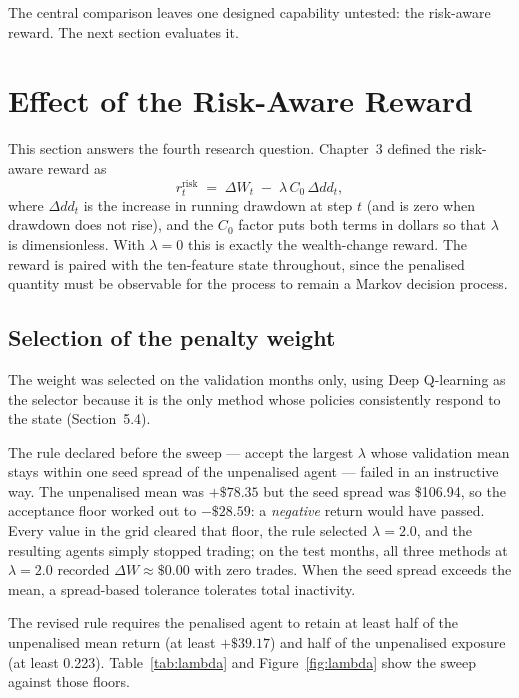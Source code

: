 The central comparison leaves one designed capability untested: the
risk-aware reward. The next section evaluates it.

\section{Effect of the Risk-Aware Reward}

This section answers the fourth research question. Chapter~3 defined the
risk-aware reward as
\[
r^{\mathrm{risk}}_t \;=\; \Delta W_t \;-\; \lambda\, C_0\, \Delta dd_t,
\]
where \(\Delta dd_t\) is the increase in running drawdown at step \(t\)
(and is zero when drawdown does not rise), and the \(C_0\) factor puts
both terms in dollars so that \(\lambda\) is dimensionless. With
\(\lambda = 0\) this is exactly the wealth-change reward. The reward is
paired with the ten-feature state throughout, since the penalised
quantity must be observable for the process to remain a Markov decision
process.

\subsection{Selection of the penalty weight}

The weight was selected on the validation months only, using Deep
Q-learning as the selector because it is the only method whose policies
consistently respond to the state (Section~5.4).

The rule declared before the sweep --- accept the largest $\lambda$ whose
validation mean stays within one seed spread of the unpenalised agent ---
failed in an instructive way. The unpenalised mean was $+\$78.35$ but the
seed spread was \$106.94, so the acceptance floor worked out to
$-\$28.59$: a \emph{negative} return would have passed. Every value in the
grid cleared that floor, the rule selected $\lambda = 2.0$, and the
resulting agents simply stopped trading; on the test months, all three
methods at $\lambda = 2.0$ recorded $\Delta W \approx \$0.00$ with zero
trades. When the seed spread exceeds the mean, a spread-based tolerance
tolerates total inactivity.

The revised rule requires the penalised agent to retain at least half of
the unpenalised mean return (at least $+\$39.17$) and half of the
unpenalised exposure (at least 0.223). Table~\ref{tab:lambda} and
Figure~\ref{fig:lambda} show the sweep against those floors.

